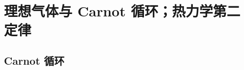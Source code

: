 \begin{example}[海拔与气温的关系]
%
\end{example}

\section{理想气体与 Carnot 循环；热力学第二定律}
\label{sec:ideal-gas-carnot-cycle-and-second-law}

\subsection{Carnot 循环} \label{subsec:carnot-cycle}

